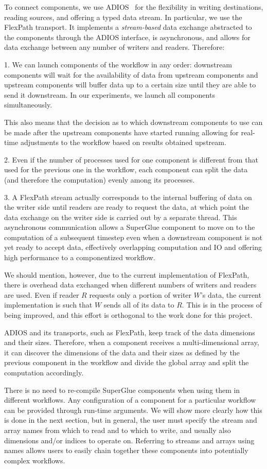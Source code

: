 To connect components, we use
ADIOS~\cite{lofstead:2009:adaptable}
for the flexibility in writing destinations,
reading sources, and offering a
typed data stream. In particular, we use
the FlexPath transport. It implements
a {\em stream-based} data exchange abstracted to
the components through the
ADIOS interface, is asynchronous, and allows for
data exchange between any
number of writers and readers. Therefore:

1. We can launch components of the workflow
in any order: downstream components
will wait for the availability of data from
upstream components and upstream
components will buffer data up to a certain
size until they are able to send it
downstream. In our experiments,
we launch all components simultaneously.

This also means that the decision as to
which downstream components to use can be made after
the upstream components have started
running allowing for real-time adjustments to the
workflow based on results obtained upstream.
\fi

2. Even if the number of processes used for one
component is different from that used for the previous
one in the workflow, each component can split the data
(and therefore the computation) evenly among its processes.

3. A FlexPath stream actually corresponds
to the internal buffering of data on the writer side
until readers are ready to request the data,
at which point the data exchange
on the writer side is carried out
by a separate thread.
This asynchronous communication allows a 
SuperGlue component to move on to the computation
of a subsequent timestep even when a downstream
component is not yet ready to accept data,
effectively overlapping computation and IO
and offering high performance to a componentized workflow.

We should mention, however, due to the current implementation of FlexPath, there is overhead
data exchanged when different numbers of writers and readers are used. Even if
reader $R$ requests only a portion of writer $W$'s data, the current implementation
is such that $W$ sends all of its data to $R$. This is in the process of being
improved, and this effort is orthogonal to the work done for this project.
\fi

ADIOS and its transports, such as FlexPath,
keep track of the
data dimensions and their sizes. Therefore, when a
component receives a
multi-dimensional array, it can discover the dimensions
of the data and their
sizes as defined by the previous component
in the workflow and divide the global array
and split the computation accordingly.

There is no need to re-compile SuperGlue components when using them
in different workflows. Any configuration
of a component for a particular workflow
can be provided through run-time arguments.
We will show more clearly how this is done in the next section,
but in general, the user must specify the
stream and array names from which to read
and to which to write,
and usually also dimensions and/or
indices to operate on.
Referring to
streams and arrays using names allows users to
easily chain together these
components into potentially complex workflows.

\fi
